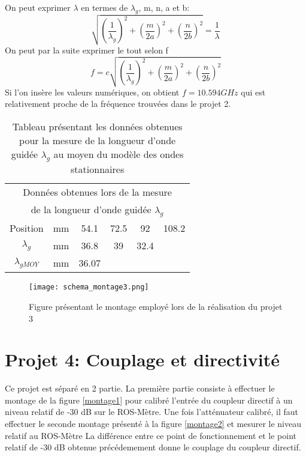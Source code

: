 On peut exprimer $\lambda$ en termes de $\lambda_g$, m, n, a et b:
\begin{equation}
\sqrt{\left(\frac{1}{\lambda_g}\right)^2 + \left(\frac{m}{2a}\right)^2  + \left(\frac{n}{2b}\right)^2} = \frac{1}{\lambda}
\end{equation}
On peut par la suite exprimer le tout selon f
\begin{equation}
f = c\sqrt{\left(\frac{1}{\lambda_g}\right)^2 + \left(\frac{m}{2a}\right)^2  +  \left(\frac{n}{2b}\right)^2}
\end{equation}
Si l'on insère les valeurs numériques, on obtient $f = 10.594GHz$ qui est relativement proche de la fréquence trouvées dans le projet 2.

\begin{table}[htbp]
  \centering
    \begin{tabular}{|c|c|cccc|}
    \multicolumn{6}{c}{Données obtenues lors de la mesure}\\
    \multicolumn{6}{c}{ de la longueur d'onde guidée $\lambda_g$} \\\hline
    Position & mm    & 54.1  & 72.5  & 92    & 108.2 \\\hline
    $\lambda_g$ & mm    & 36.8  & 39    & 32.4  &  \\\hline
    $\lambda_{gMOY}$ & mm    & 36.07 &       &       &  \\\hline
    \end{tabular}%
  \caption{Tableau présentant les données obtenues pour la mesure de la longueur d'onde guidée $\lambda_g$ au moyen du modèle des ondes stationnaires}
  \label{tab:1}%
\end{table}%
\begin{figure}
\centering
\texttt{[image: schema\_montage3.png]}
\caption{Figure présentant le montage employé lors de la réalisation du projet 3}
\label{fig:5}
\end{figure}

\section{Projet 4: Couplage et directivité}
Ce projet est séparé en 2 partie. La première partie consiste à effectuer le montage de la figure \ref{montage1} pour calibré l'entrée du coupleur directif à un niveau relatif de -30 dB sur le ROS-Mètre. Une fois l'atténuateur calibré, il faut effectuer le seconde montage présenté à la figure \ref{montage2} et mesurer le niveau relatif au ROS-Mètre La différence entre ce point de fonctionnement et le point relatif de -30 dB obtenue précédemement donne le couplage du coupleur directif.

